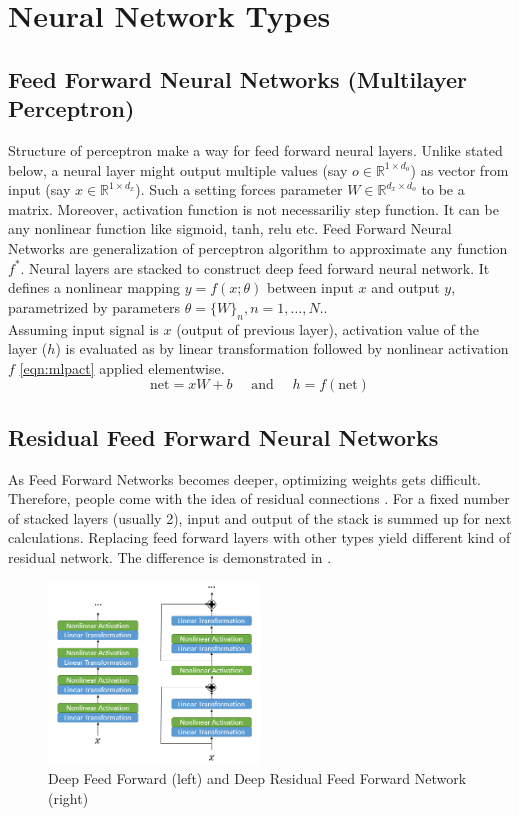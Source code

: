 
\section{Neural Network Types}
\label{sec:nnet_types}
\subsection{Feed Forward Neural Networks (Multilayer Perceptron)}
Structure of perceptron make a way for feed forward neural layers. Unlike stated below, a neural layer might output multiple values (say $o \in \mathbb{R}^{1 \times d_o}$) as vector from input (say $x \in \mathbb{R}^{1 \times d_x}$). Such a setting forces parameter $W \in \mathbb{R}^{d_x \times d_o} $ to be a matrix. Moreover, activation function is not necessariliy step function. It can be any nonlinear function like sigmoid, tanh, relu etc. Feed Forward Neural Networks are generalization of perceptron algorithm to approximate any function $f^*$. Neural layers are stacked to construct deep feed forward neural network. It defines a nonlinear mapping $y=f(x;\theta)$ between input $x$ and output $y$, parametrized by parameters $\theta = \{W\}_n,n=1,…,N.$. \\
Assuming input signal is $x$ (output of previous layer), activation value of the layer ($h$) is evaluated as by linear transformation followed by nonlinear activation $f$ \eqref{eqn:mlpact} applied elementwise. \\
\begin{equation}
\label{eqn:mlpact}
\text{net} = x W + b \quad \text{ and }\quad  h = f(\text{net})
\end{equation}
\subsection{Residual Feed Forward Neural Networks}
As Feed Forward Networks becomes deeper, optimizing weights gets difficult. Therefore, people come with the idea of residual connections \cite{he_deep_2015}. For a fixed number of stacked layers (usually 2), input and output of the stack is summed up for next calculations. Replacing feed forward layers with other types yield different kind of residual network. The difference is demonstrated in . \\
\begin{figure}
	\centering
	\includegraphics[width=0.5\textwidth]{figures/ml_theory/rffnn_ffnn.png}
	\caption{Deep Feed Forward (left) and Deep Residual Feed Forward Network (right)}
	\label{fig:rffnn_ffnn}
\end{figure}

